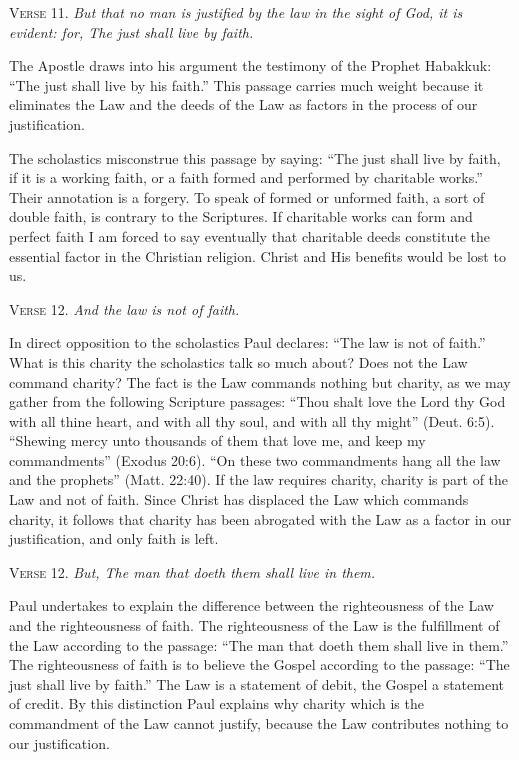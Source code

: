 \textsc{Verse} 11. \emph{But that no man is justified by the law in the sight of God, it is evident: for, The just shall live by faith.}

The Apostle draws into his argument the testimony of the Prophet Habakkuk: “The just shall live by his faith.” This passage carries much weight because it eliminates the Law and the deeds of the Law as factors in the process of our justification.

The scholastics misconstrue this passage by saying: “The just shall live by faith, if it is a working faith, or a faith formed and performed by charitable works.” Their annotation is a forgery. To speak of formed or unformed faith, a sort of double faith, is contrary to the Scriptures. If charitable works can form and perfect faith I am forced to say eventually that charitable deeds constitute the essential factor in the Christian religion. Christ and His benefits would be lost to us.

\textsc{Verse} 12. \emph{And the law is not of faith.}

In direct opposition to the scholastics Paul declares: “The law is not of faith.” What is this charity the scholastics talk so much about? Does not the Law command charity? The fact is the Law commands nothing but charity, as we may gather from the following Scripture passages: “Thou shalt love the Lord thy God with all thine heart, and with all thy soul, and with all thy might” (Deut. 6:5). “Shewing mercy unto thousands of them that love me, and keep my commandments” (Exodus 20:6). “On these two commandments hang all the law and the prophets” (Matt. 22:40). If the law requires charity, charity is part of the Law and not of faith. Since Christ has displaced the Law which commands charity, it follows that charity has been abrogated with the Law as a factor in our justification, and only faith is left.

\textsc{Verse} 12. \emph{But, The man that doeth them shall live in them.}

Paul undertakes to explain the difference between the righteousness of the Law and the righteousness of faith. The righteousness of the Law is the fulfillment of the Law according to the passage: “The man that doeth them shall live in them.” The righteousness of faith is to believe the Gospel according to the passage: “The just shall live by faith.” The Law is a statement of debit, the Gospel a statement of credit. By this distinction Paul explains why charity which is the commandment of the Law cannot justify, because the Law contributes nothing to our justification.

